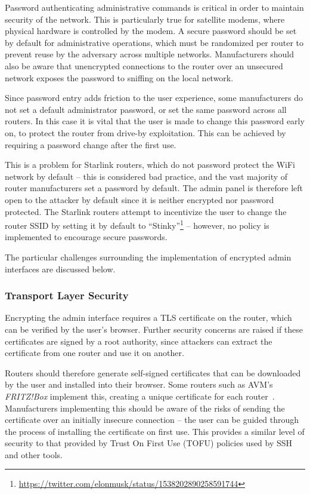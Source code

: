 Password authenticating administrative commands is critical in order to maintain security of the network.
This is particularly true for satellite modems, where physical hardware is controlled by the modem.
A secure password should be set by default for administrative operations, which must be randomized per router to prevent reuse by the adversary across multiple networks.
Manufacturers should also be aware that unencrypted connections to the router over an unsecured network exposes the password to sniffing on the local network.

Since password entry adds friction to the user experience, some manufacturers do not set a default administrator password, or set the same password across all routers.
In this case it is vital that the user is made to change this password early on, to protect the router from drive-by exploitation.
This can be achieved by requiring a password change after the first use.

This is a problem for Starlink routers, which do not password protect the WiFi network by default -- this is considered bad practice, and the vast majority of router manufacturers set a password by default.
The admin panel is therefore left open to the attacker by default since it is neither encrypted nor password protected.
The Starlink routers attempt to incentivize the user to change the router SSID by setting it by default to ``Stinky''\footnote{\url{https://twitter.com/elonmusk/status/1538202890258591744}} -- however, no policy is implemented to encourage secure passwords.

The particular challenges surrounding the implementation of encrypted admin interfaces are discussed below.

\subsubsection{Transport Layer Security}

Encrypting the admin interface requires a TLS certificate on the router, which can be verified by the user's browser.
Further security concerns are raised if these certificates are signed by a root authority, since attackers can extract the certificate from one router and use it on another.

Routers should therefore generate self-signed certificates that can be downloaded by the user and installed into their browser.
Some routers such as AVM's \textit{FRITZ!Box} implement this, creating a unique certificate for each router~\cite{fritzbox_cert}.
Manufacturers implementing this should be aware of the risks of sending the certificate over an initially insecure connection -- the user can be guided through the process of installing the certificate on first use.
This provides a similar level of security to that provided by Trust On First Use (TOFU) policies used by SSH and other tools.

